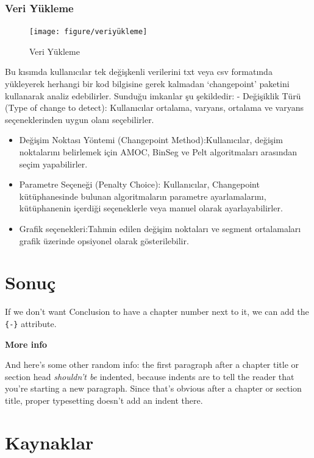 \documentclass[12pt,twoside]{deuthesis}
\begin{document}
\subsection{Veri Yükleme}\label{veri-yuxfckleme}

\begin{figure}
\texttt{[image: figure/veriyükleme]} \caption{Veri Yükleme}\label{fig:unnamed-chunk-14}
\end{figure}

Bu kısımda kullanıcılar tek değişkenli verilerini txt veya csv formatında yükleyerek herhangi bir kod bilgisine gerek kalmadan `changepoint' paketini kullanarak analiz edebilirler. Sunduğu imkanlar şu şekildedir:
- Değişiklik Türü (Type of change to detect): Kullanıcılar ortalama, varyans, ortalama ve varyans seçeneklerinden uygun olanı seçebilirler.

\begin{itemize}
\item
  Değişim Noktası Yöntemi (Changepoint Method):Kullanıcılar, değişim noktalarını belirlemek için AMOC, BinSeg ve Pelt algoritmaları arasından seçim yapabilirler.
\item
  Parametre Seçeneği (Penalty Choice): Kullanıcılar, Changepoint kütüphanesinde bulunan algoritmaların parametre ayarlamalarını, kütüphanenin içerdiği seçeneklerle veya manuel olarak ayarlayabilirler.
\item
  Grafik seçenekleri:Tahmin edilen değişim noktaları ve segment ortalamaları grafik üzerinde opsiyonel olarak gösterilebilir.
\end{itemize}

\chapter*{Sonuç}\label{sonuuxe7}

If we don't want Conclusion to have a chapter number next to it, we can add the \texttt{\{-\}} attribute.

\textbf{More info}

And here's some other random info: the first paragraph after a chapter title or section head \emph{shouldn't be} indented, because indents are to tell the reader that you're starting a new paragraph. Since that's obvious after a chapter or section title, proper typesetting doesn't add an indent there.

\chapter*{Kaynaklar}\label{kaynaklar}
\end{document}
